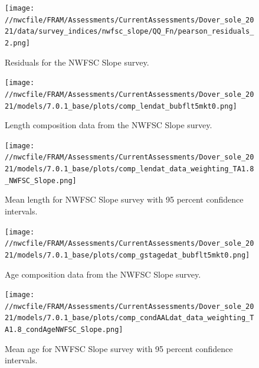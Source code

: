 \documentclass[11pt,
  english,
  a4paper,
]{article}
\begin{document}
\begin{figure}
\centering
\texttt{[image: //nwcfile/FRAM/Assessments/CurrentAssessments/Dover\_sole\_2021/data/survey\_indices/nwfsc\_slope/QQ\_Fn/pearson\_residuals\_2.png]}
\caption{Residuals for the NWFSC Slope survey.\label{fig:nwfsc-resid}}
\end{figure}

\tagmcend\tagstructend


\begin{figure}
\centering
\texttt{[image: //nwcfile/FRAM/Assessments/CurrentAssessments/Dover\_sole\_2021/models/7.0.1\_base/plots/comp\_lendat\_bubflt5mkt0.png]}
\caption{Length composition data from the NWFSC Slope survey.\label{fig:nw-slope-len-data}}
\end{figure}

\tagmcend\tagstructend


\begin{figure}
\centering
\texttt{[image: //nwcfile/FRAM/Assessments/CurrentAssessments/Dover\_sole\_2021/models/7.0.1\_base/plots/comp\_lendat\_data\_weighting\_TA1.8\_NWFSC\_Slope.png]}
\caption{Mean length for NWFSC Slope survey with 95 percent confidence intervals.\label{fig:mean-nw-slope-len-data}}
\end{figure}

\tagmcend\tagstructend


\begin{figure}
\centering
\texttt{[image: //nwcfile/FRAM/Assessments/CurrentAssessments/Dover\_sole\_2021/models/7.0.1\_base/plots/comp\_gstagedat\_bubflt5mkt0.png]}
\caption{Age composition data from the NWFSC Slope survey.\label{fig:nw-slope-age-data}}
\end{figure}

\tagmcend\tagstructend


\begin{figure}
\centering
\texttt{[image: //nwcfile/FRAM/Assessments/CurrentAssessments/Dover\_sole\_2021/models/7.0.1\_base/plots/comp\_condAALdat\_data\_weighting\_TA1.8\_condAgeNWFSC\_Slope.png]}
\caption{Mean age for NWFSC Slope survey with 95 percent confidence intervals.\label{fig:mean-nw-slope-age-data}}
\end{figure}
\end{document}

